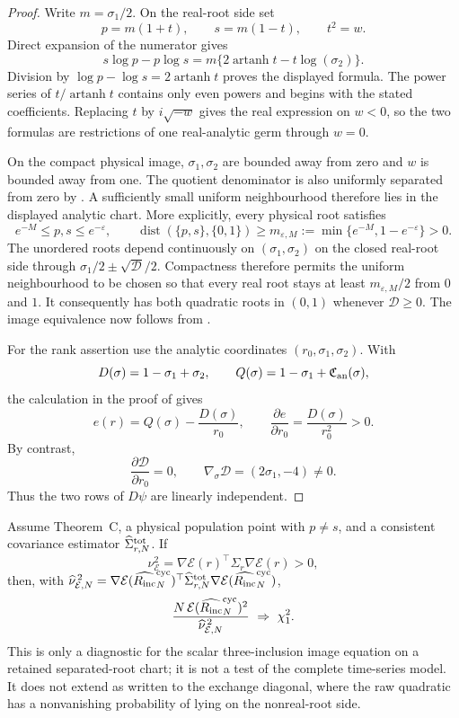\begin{proof}
Write \(m=\sigma_1/2\).  On the real-root side set
\[
p=m(1+t),\qquad s=m(1-t),\qquad t^2=w.
\]
Direct expansion of the numerator gives
\[
s\log p-p\log s
=m\{2\operatorname{artanh}t-t\log(\sigma_2)\}.
\]
Division by
\(\log p-\log s=2\operatorname{artanh}t\) proves the displayed formula.
The power series of \(t/\operatorname{artanh}t\) contains only even powers
and begins with the stated coefficients.  Replacing \(t\) by
\(i\sqrt{-w}\) gives the real expression on \(w<0\), so the two formulas
are restrictions of one real-analytic germ through \(w=0\).

On the compact physical image,
\(\sigma_1,\sigma_2\) are bounded away from zero and \(w\) is bounded away
from one.  The quotient denominator is also uniformly separated from zero
by .  A sufficiently small uniform
neighbourhood therefore lies in the displayed analytic chart.  More
explicitly, every physical root satisfies
\[
e^{-M}\le p,s\le e^{-\varepsilon},
\qquad
\operatorname{dist}(\{p,s\},\{0,1\})
\ge m_{\varepsilon,M}:=\min\{e^{-M},1-e^{-\varepsilon}\}>0.
\]
The unordered roots depend continuously on \((\sigma_1,\sigma_2)\) on the
closed real-root side through
\(\sigma_1/2\pm\sqrt{\mathcal D}/2\).  Compactness therefore permits the
uniform neighbourhood to be chosen so that every real root stays at least
\(m_{\varepsilon,M}/2\) from \(0\) and \(1\).  It consequently has both
quadratic roots in \((0,1)\) whenever \(\mathcal D\ge0\).  The image
equivalence now follows from
.

For the rank assertion use the analytic coordinates
\((r_0,\sigma_1,\sigma_2)\).  With
\[
D(\sigma)=1-\sigma_1+\sigma_2,
\qquad
Q(\sigma)=1-\sigma_1+\mathfrak C_{\rm an}(\sigma),
\]
the calculation in the proof of
 gives
\[
e(r)=Q(\sigma)-\frac{D(\sigma)}{r_0},
\qquad
\frac{\partial e}{\partial r_0}
=\frac{D(\sigma)}{r_0^2}>0.
\]
By contrast,
\[
\frac{\partial\mathcal D}{\partial r_0}=0,
\qquad
\nabla_\sigma\mathcal D=(2\sigma_1,-4)\ne0.
\]
Thus the two rows of \(D\psi\) are linearly independent.
\end{proof}

\begin{corollary}
\label{cor:separated-root-image-diagnostic-main}
Assume Theorem~C, a physical population point with \(p\ne s\), and a
consistent covariance estimator \(\widehat\Sigma_{r,N}^{\rm tot}\).  If
\[
\nu_{\mathcal E}^2=
\nabla\mathcal E(r)^\top\Sigma_r
\nabla\mathcal E(r)>0,
\]
then, with
\(\widehat\nu_{\mathcal E,N}^{\,2}=
\nabla\mathcal E(\widehat{R_{\mathrm{inc}}}_N^{\rm cyc})^\top
\widehat\Sigma_{r,N}^{\rm tot}
\nabla\mathcal E(\widehat{R_{\mathrm{inc}}}_N^{\rm cyc})\),
\[
\frac{N\,\mathcal E(\widehat{R_{\mathrm{inc}}}_N^{\rm cyc})^2}
{\widehat\nu_{\mathcal E,N}^{\,2}}\ \Rightarrow\ \chi_1^2.
\]
This is only a diagnostic for the scalar three-inclusion image equation on a
retained separated-root chart; it is not a test of the complete time-series
model.  It does not extend as written to the exchange diagonal, where the raw
quadratic has a nonvanishing probability of lying on the nonreal-root side.
\end{corollary}

